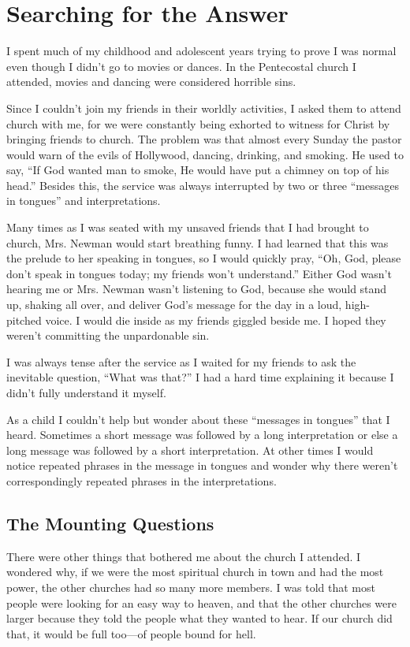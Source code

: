 \chapter{Searching for the Answer}

I spent much of my childhood and adolescent years
trying to prove I was normal even though I didn’t go to
movies or dances. In the Pentecostal church I attended,
movies and dancing were considered horrible sins.

Since I couldn’t join my friends in their worldly activities,
I asked them to attend church with me, for we were
constantly being exhorted to witness for Christ by bringing
friends to church. The problem was that almost every
Sunday the pastor would warn of the evils of Hollywood,
dancing, drinking, and smoking. He used to say, “If God
wanted man to smoke, He would have put a chimney on
top of his head.” Besides this, the service was always interrupted
by two or three “messages in tongues” and interpretations.

Many times as I was seated with my unsaved friends
that I had brought to church, Mrs. Newman would start
breathing funny. I had learned that this was the prelude
to her speaking in tongues, so I would quickly pray, “Oh,
God, please don’t speak in tongues today; my friends
won’t understand.” Either God wasn’t hearing me or Mrs.
Newman wasn’t listening to God, because she would stand
up, shaking all over, and deliver God’s message for the
day in a loud, high-pitched voice. I would die inside as my
friends giggled beside me. I hoped they weren’t committing
the unpardonable sin.

I was always tense after the service as I waited for my
friends to ask the inevitable question, “What was that?” I
had a hard time explaining it because I didn’t fully understand
it myself.

As a child I couldn’t help but wonder about these “messages
in tongues” that I heard. Sometimes a short message
was followed by a long interpretation or else a long message
was followed by a short interpretation. At other times
I would notice repeated phrases in the message in tongues
and wonder why there weren’t correspondingly repeated
phrases in the interpretations.


\section*{The Mounting Questions}

There were other things that bothered me about the
church I attended. I wondered why, if we were the most
spiritual church in town and had the most power, the other
churches had so many more members. I was told that most
people were looking for an easy way to heaven, and that
the other churches were larger because they told the people
what they wanted to hear. If our church did that, it would
be full too—of people bound for hell.


